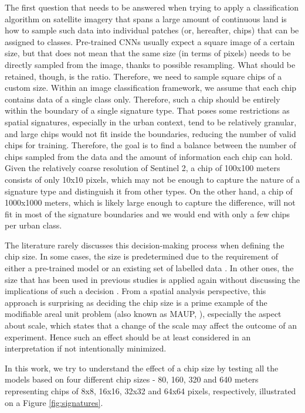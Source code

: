 The first question that needs to be answered when trying to apply a classification
algorithm on satellite imagery that spans a large amount of continuous land is how
to sample such data into individual patches (or, hereafter, chips)
that can be assigned to classes. Pre-trained CNNs usually expect a square image of
a certain size, but that does not mean that the same size (in terms of pixels) needs to
be directly sampled from the image, thanks to possible resampling. What should be
retained, though, is the ratio. Therefore, we need to sample square chips of a
custom size. Within an image classification framework, we assume that
each chip contains data of a single class only. Therefore, such a chip should be entirely
within the boundary of a single signature type. That poses some restrictions as spatial
signatures, especially in the urban context, tend to be relatively granular, and large chips
would not fit inside the boundaries, reducing the number of
valid chips for training. Therefore, the goal is to find a balance
between the number of chips sampled from the data and the amount of
information each chip can hold. Given the relatively coarse resolution of Sentinel 2, a
chip of 100x100 meters consists of only 10x10 pixels, which may not be enough to capture
the nature of a signature type and distinguish it from other types. On the other hand, a
chip of 1000x1000 meters, which is likely large enough to capture the difference, will
not fit in most of the signature boundaries and we would end with only a few chips per
urban class.

The literature rarely discusses this decision-making process when defining the chip
size. In some cases, the size is predetermined due to the requirement of either a
pre-trained model or an existing set of labelled data \citep{taubenbock2020}. In
other ones, the size that has
been used in previous studies is applied again without discussing the implications
of such a decision \citep{wang2018mapping}. From a spatial analysis
perspective, this approach is surprising as deciding the chip size is a prime example of the
modifiable areal unit problem (also known as MAUP,
\citealp{openshaw1981modifiable}), especially the aspect about scale, which states that
a change of the scale may affect the outcome of an experiment. Hence such an effect
should be at least considered in an interpretation if not intentionally minimized.

In this work, we try to understand the effect of a chip size by testing all the models
based on four different chip sizes - 80, 160, 320 and 640 meters representing chips of
8x8, 16x16, 32x32 and 64x64 pixels, respectively, illustrated on a Figure \ref{fig:signatures}.


